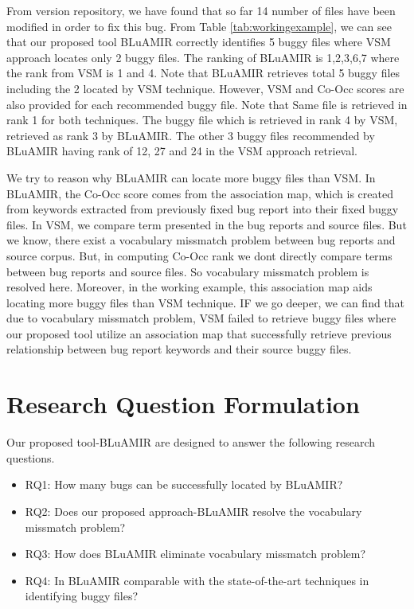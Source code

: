 \documentclass[conference]{IEEEtran}
\begin{document}
From version repository, we have found that so far 14 number of files have been modified in order to fix this bug. From Table \ref{tab:workingexample}, we can see that our proposed tool BLuAMIR correctly identifies 5 buggy files where VSM approach locates only 2 buggy files. The ranking of BLuAMIR is 1,2,3,6,7 where the rank from VSM is 1 and 4. Note that BLuAMIR retrieves total 5 buggy files including the 2 located by VSM technique. However, VSM and Co-Occ scores are also provided for each recommended buggy file. 
Note that Same file is retrieved in rank 1 for both techniques. The buggy file which is retrieved in rank 4 by VSM, retrieved as rank 3 by BLuAMIR. The other 3 buggy files recommended by BLuAMIR having rank of 12, 27 and 24  in the VSM approach retrieval.

We try to reason why BLuAMIR can locate more buggy files than VSM. In BLuAMIR, the Co-Occ score comes from the association map, which is created from keywords extracted from previously fixed bug report into their fixed buggy files. In VSM, we compare term presented in the bug reports and source files. But we know, there exist a vocabulary missmatch problem between bug reports and source corpus. But, in computing Co-Occ rank we dont directly compare terms between bug reports and source files. So vocabulary missmatch problem is resolved here. Moreover, in the working example, this association map aids locating more buggy files than VSM technique. IF we go deeper, we can find that due to vocabulary missmatch problem, VSM failed to retrieve buggy files where our proposed tool utilize an association map that successfully retrieve previous relationship between bug report keywords and their source buggy files. 

\section{Research Question Formulation}
Our proposed tool-BLuAMIR are designed to  answer the following research questions.
\begin{itemize}
	\item RQ1: How many bugs can be successfully located by BLuAMIR?
	\item RQ2: Does our proposed approach-BLuAMIR resolve the vocabulary missmatch problem?
	\item RQ3: How does BLuAMIR eliminate vocabulary missmatch problem?
	\item RQ4: In BLuAMIR comparable with the state-of-the-art techniques in identifying buggy files?
\end{itemize}
\end{document}
